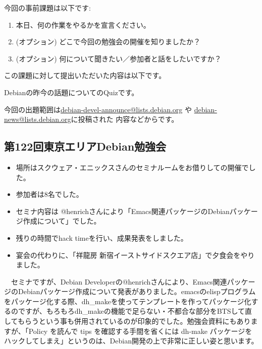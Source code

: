 \documentclass[mingoth,a4paper]{jsarticle}
\begin{document}

今回の事前課題は以下です:
\begin{enumerate}
\item 本日、何の作業をやるかを宣言ください。
\item (オプション) どこで今回の勉強会の開催を知りましたか？
\item (オプション) 何について聞きたい／参加者と話をしたいですか？
\end{enumerate}
この課題に対して提出いただいた内容は以下です。
\begin{multicols}{2}
{\small

}
\end{multicols}


 Debianの昨今の話題についてのQuizです。

今回の出題範囲は\url{debian-devel-announce@lists.debian.org} や \url{debian-news@lists.debian.org}に投稿された
内容などからです。

\begin{multicols}{2}

\end{multicols}



\subsection{第122回東京エリアDebian勉強会}

\begin{itemize}
\item 場所はスクウェア・エニックスさんのセミナルームをお借りしての開催でした。
\item 参加者は8名でした。
\item セミナ内容は @henrichさんにより「Emacs関連パッケージのDebianパッケージ作成について」でした。
\item 残りの時間でhack timeを行い、成果発表をしました。
\item 宴会の代わりに、「祥龍房 新宿イーストサイドスクエア店」で夕食会をやりました。
\end{itemize} 

　セミナですが、Debian Developerの@henrichさんにより、Emacs関連パッケージのDebianパッケージ作成について発表がありました。emacsのelispプログラムをパッケージ化する際、dh\_makeを使ってテンプレートを作ってパッケージ化するのですが、もろもろdh\_makeの機能で足らない・不都合な部分をBTSして直してもらうという事も併用されているのが印象的でした。勉強会資料にもありますが、「Policy を読んで tips を確認する手間を省くには dh-make パッケージをハックしてしまえ」というのは、Debian開発の上で非常に正しい姿と思います。
\end{document}
